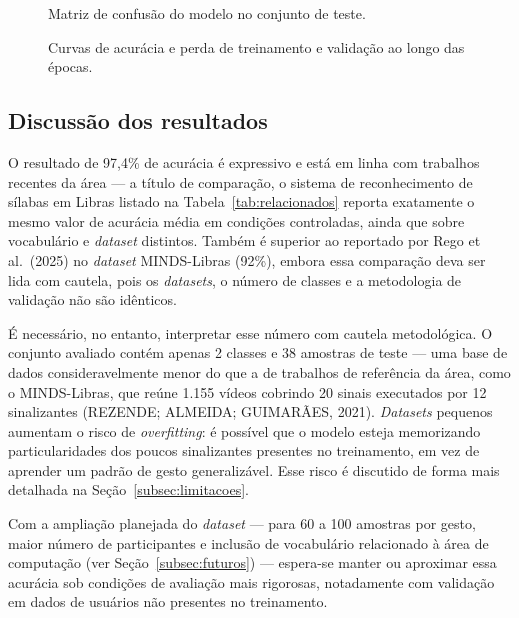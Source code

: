 \begin{figure}[htbp]
\centering
{}
\caption{Matriz de confusão do modelo no conjunto de teste.}
\label{fig:cm-modelo}
\end{figure}

\begin{figure}[htbp]
\centering
{}
\caption{Curvas de acurácia e perda de treinamento e validação ao longo das
épocas.}
\label{fig:curvas}
\end{figure}

\subsection{Discussão dos resultados}

O resultado de 97,4\% de acurácia é expressivo e está em linha com trabalhos
recentes da área — a título de comparação, o sistema de reconhecimento de sílabas
em Libras listado na Tabela~\ref{tab:relacionados} reporta exatamente o mesmo
valor de acurácia média em condições controladas, ainda que sobre vocabulário e
\textit{dataset} distintos. Também é superior ao reportado por Rego et al.\ (2025)
no \textit{dataset} MINDS-Libras (92\%), embora essa comparação deva ser lida com
cautela, pois os \textit{datasets}, o número de classes e a metodologia de
validação não são idênticos.

É necessário, no entanto, interpretar esse número com cautela metodológica. O
conjunto avaliado contém apenas 2 classes e 38 amostras de teste — uma base de
dados consideravelmente menor do que a de trabalhos de referência da área, como o
MINDS-Libras, que reúne 1.155 vídeos cobrindo 20 sinais executados por 12
sinalizantes (REZENDE; ALMEIDA; GUIMARÃES, 2021). \textit{Datasets} pequenos
aumentam o risco de \textit{overfitting}: é possível que o modelo esteja
memorizando particularidades dos poucos sinalizantes presentes no treinamento, em
vez de aprender um padrão de gesto generalizável. Esse risco é discutido de forma
mais detalhada na Seção~\ref{subsec:limitacoes}.

Com a ampliação planejada do \textit{dataset} — para 60 a 100 amostras por gesto,
maior número de participantes e inclusão de vocabulário relacionado à área de
computação (ver Seção~\ref{subsec:futuros}) — espera-se manter ou aproximar essa
acurácia sob condições de avaliação mais rigorosas, notadamente com validação em
dados de usuários não presentes no treinamento.

